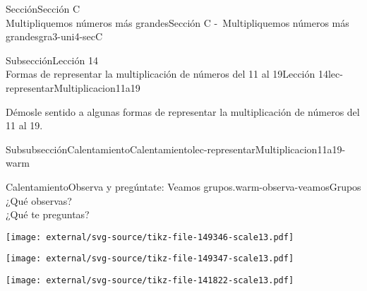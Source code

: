\begin{sectionptx}{Sección}{{\Large Sección C\\}Multipliquemos números más grandes}{}{Sección C -~Multipliquemos números más grandes}{}{}{gra3-uni4-secC}
\typeout{************************************************}
%
\clearpage
\begin{subsectionptx}{Subsección}{{\normalsize Lección 14\\[-0.05cm]}Formas de representar la multiplicación de números del 11 al 19}{}{Lección 14}{}{}{lec-representarMultiplicacion11a19}
\begin{introduction}{}%
Démosle sentido a algunas formas de representar la multiplicación de números del 11 al 19.%
\end{introduction}%
%
%
\typeout{************************************************}
\typeout{************************************************}
%
\begin{subsubsectionptx}{Subsubsección}{Calentamiento}{}{Calentamiento}{}{}{lec-representarMultiplicacion11a19-warm}
\begin{exploration}{Calentamiento}{Observa y pregúntate: Veamos grupos.}{warm-observa-veamosGrupos}%
¿Qué observas?\\
 ¿Qué te preguntas?%
\vspace{0pt}
\begin{sidebyside}{3}{0}{0}{0}%
\begin{sbspanel}{0.333333333333333}%
\texttt{[image: external/svg-source/tikz-file-149346-scale13.pdf]}
\end{sbspanel}%
\begin{sbspanel}{0.333333333333333}%
\texttt{[image: external/svg-source/tikz-file-149347-scale13.pdf]}
\end{sbspanel}%
\begin{sbspanel}{0.333333333333333}%
\texttt{[image: external/svg-source/tikz-file-141822-scale13.pdf]}
\end{sbspanel}%
\end{sidebyside}%
\end{exploration}%
\end{subsubsectionptx}
%
%
\typeout{************************************************}

\end{subsectionptx}
\end{sectionptx}
